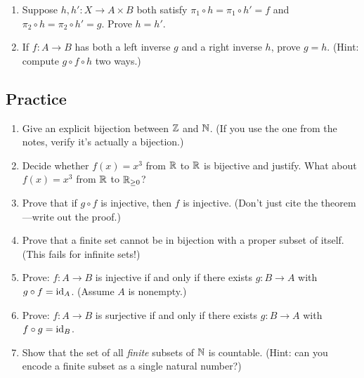 \begin{goingdeeper}
\begin{enumerate}
  \item Suppose $h, h': X \to A \times B$ both satisfy $\pi_1 \circ h = \pi_1 \circ h' = f$ and $\pi_2 \circ h = \pi_2 \circ h' = g$. Prove $h = h'$.

  \item If $f: A \to B$ has both a left inverse $g$ and a right inverse $h$, prove $g = h$. (Hint: compute $g \circ f \circ h$ two ways.)
\end{enumerate}
\end{goingdeeper}

\subsection*{Practice}
\begin{enumerate}
  \item Give an explicit bijection between $\mathbb{Z}$ and $\mathbb{N}$. (If you use the one from the notes, verify it's actually a bijection.)
  \item Decide whether $f(x)=x^3$ from $\mathbb{R}$ to $\mathbb{R}$ is bijective and justify. What about $f(x) = x^3$ from $\mathbb{R}$ to $\mathbb{R}_{\geq 0}$?
  \item Prove that if $g\circ f$ is injective, then $f$ is injective. (Don't just cite the theorem---write out the proof.)
  \item Prove that a finite set cannot be in bijection with a proper subset of itself. (This fails for infinite sets!)
  \item Prove: $f: A \to B$ is injective if and only if there exists $g: B \to A$ with $g \circ f = \operatorname{id}_A$. (Assume $A$ is nonempty.)
  \item Prove: $f: A \to B$ is surjective if and only if there exists $g: B \to A$ with $f \circ g = \operatorname{id}_B$.
  \item Show that the set of all \emph{finite} subsets of $\mathbb{N}$ is countable. (Hint: can you encode a finite subset as a single natural number?)
\end{enumerate}

